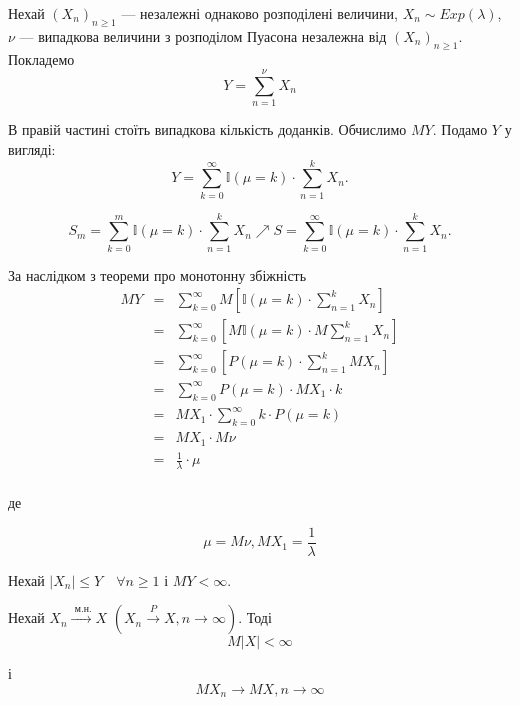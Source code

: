 \begin{example}
    Нехай  $(X_n)_{n \geqslant 1}$ --- незалежні однаково розподілені величини,
    $X_n \sim Exp(\lambda)$, $\nu$ --- випадкова величини з розподілом Пуасона
    незалежна від $(X_n)_{n \geqslant 1}$.
    Покладемо
    $$Y
    = \sum\limits_{n=1}^{\nu} X_n$$
    
    В правій частині стоїть випадкова кількість  доданків.
    Обчислимо $MY$.
    Подамо $Y$ у  вигляді:
    $$Y = \sum\limits_{k=0}^{\infty} \mathbb{I}(\mu = k) \cdot \sum\limits_{n=1}^{k} X_n.$$
    
    $$S_m = \sum\limits_{k=0}^{m} \mathbb{I}(\mu = k) \cdot \sum\limits_{n=1}^{k} X_n \nearrow
    S = \sum\limits_{k=0}^{\infty} \mathbb{I}(\mu = k) \cdot \sum\limits_{n=1}^{k} X_n.$$
    
    За наслідком з теореми про монотонну збіжність
    $$\begin{array}{rcl}
        MY & = & \sum\limits_{k=0}^{\infty} M[\mathbb{I}(\mu=k) \cdot \sum\limits_{n=1}^{k} X_n] \\ 
        & = & \sum\limits_{k=0}^{\infty} [M\mathbb{I}(\mu=k) \cdot M\sum\limits_{n=1}^{k} X_n] \\
        & = & \sum\limits_{k=0}^{\infty} [P(\mu=k) \cdot \sum\limits_{n=1}^{k} MX_n] \\
        & = & \sum\limits_{k=0}^{\infty} P(\mu=k) \cdot MX_1 \cdot k \\
        & = & MX_1 \cdot \sum\limits_{k=0}^{\infty} k \cdot P(\mu=k) \\
        & = & MX_1 \cdot M\nu \\
        & = & \frac{1}{\lambda} \cdot \mu \\
    \end{array}$$
    
    де
    
    $$\mu = M\nu, MX_1 = \frac{1}{\lambda}$$
\end{example}

\begin{theorem}
    Нехай $|X_n| \leqslant Y \quad \forall n \geqslant 1$ і $MY < \infty$.
    
    Нехай $X_n \xrightarrow{\text{ м.н.}} X$ $(X_n \xrightarrow{P} X, n \rightarrow \infty)$.
    Тоді 
    $$M|X| < \infty$$
    
    і
    $$MX_n \rightarrow MX, n \rightarrow \infty$$
\end{theorem}

